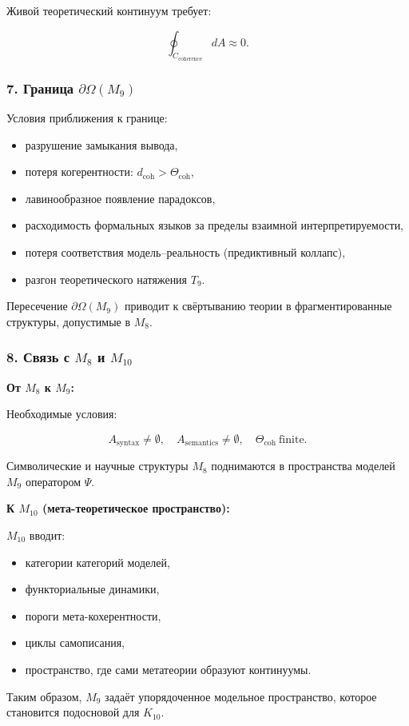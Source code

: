 Живой теоретический континуум требует:

\[
\oint_{C_{\mathrm{coherence}}} dA \approx 0.
\]

\subsubsection*{7. Граница \texorpdfstring{$\partial\Omega(M_9)$}{\partial\Omega(M_9)}}

Условия приближения к границе:

\begin{itemize}
    \item разрушение замыкания вывода,
    \item потеря когерентности: $d_{\mathrm{coh}}>\Theta_{\mathrm{coh}}$,
    \item лавинообразное появление парадоксов,
    \item расходимость формальных языков за пределы взаимной интерпретируемости,
    \item потеря соответствия модель–реальность (предиктивный коллапс),
    \item разгон теоретического натяжения $T_9$.
\end{itemize}

Пересечение $\partial\Omega(M_9)$ приводит к свёртыванию теории в фрагментированные структуры, допустимые в $M_8$.

\subsubsection*{8. Связь с \texorpdfstring{$M_8$}{M_8} и $M_{10}$}

\textbf{От $M_8$ к $M_9$:}

Необходимые условия:

\[
A_{\mathrm{syntax}}\neq\emptyset,
\quad
A_{\mathrm{semantics}}\neq\emptyset,
\quad
\Theta_{\mathrm{coh}}\ \text{finite}.
\]

Символические и научные структуры $M_8$ поднимаются в
пространства моделей $M_9$ оператором $\Psi$.

\textbf{К $M_{10}$ (мета-теоретическое пространство):}

$M_{10}$ вводит:

\begin{itemize}
    \item категории категорий моделей,
    \item функториальные динамики,
    \item пороги мета-кохерентности,
    \item циклы самописания,
    \item пространство, где сами метатеории образуют континуумы.
\end{itemize}

Таким образом, $M_9$ задаёт упорядоченное модельное пространство, которое становится подосновой для $K_{10}$.
